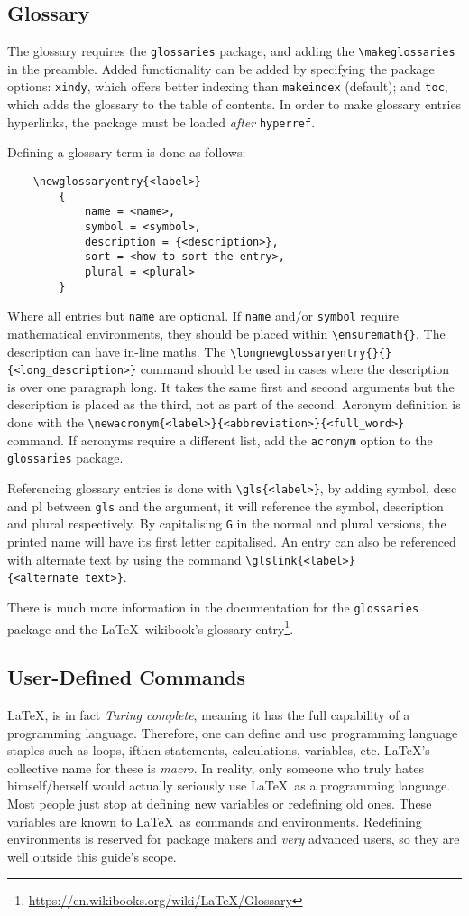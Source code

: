 \subsection{Glossary}
%
The glossary requires the \verb|glossaries| package, and adding the \verb|\makeglossaries| in the preamble. Added functionality can be added by specifying the package options: \verb|xindy|, which offers better indexing than \verb|makeindex| (default); and \verb|toc|, which adds the glossary to the table of contents. In order to make glossary entries hyperlinks, the package must be loaded \emph{after} \verb|hyperref|.

Defining a glossary term is done as follows:
\begin{verbatim}
	\newglossaryentry{<label>}
	    {
	        name = <name>,
	        symbol = <symbol>,
	        description = {<description>},
	        sort = <how to sort the entry>,
	        plural = <plural>
	    }
\end{verbatim}
Where all entries but \verb|name| are optional. If \verb|name| and/or \verb|symbol| require mathematical environments, they should be placed within \verb|\ensuremath{}|. The description can have in-line maths. The \verb|\longnewglossaryentry{}{}{<long_description>}| command should be used in cases where the description is over one paragraph long. It takes the same first and second arguments but the description is placed as the third, not as part of the second. Acronym definition is done with the \verb|\newacronym{<label>}{<abbreviation>}{<full_word>}| command. If acronyms require a different list, add the \verb|acronym| option to the \verb|glossaries| package.

Referencing glossary entries is done with \verb|\gls{<label>}|, by adding symbol, desc and pl between \verb|gls| and the argument, it will reference the symbol, description and plural respectively. By capitalising \verb|G| in the normal and plural versions, the printed name will have its first letter capitalised. An entry can also be referenced with alternate text by using the command \verb|\glslink{<label>}{<alternate_text>}|.

There is much more information in the documentation for the \verb|glossaries| package and the \LaTeX~wikibook's glossary entry\footnote{\url{https://en.wikibooks.org/wiki/LaTeX/Glossary}}.
%
\subsection{User-Defined Commands}
%
\LaTeX, is in fact \emph{Turing complete}, meaning it has the full capability of a programming language. Therefore, one can define and use programming language staples such as loops, ifthen statements, calculations, variables, etc. \LaTeX's collective name for these is \emph{macro}. In reality, only someone who truly hates himself/herself would actually seriously use \LaTeX~as a programming language. Most people just stop at defining new variables or redefining old ones. These variables are known to \LaTeX~as commands and environments. Redefining environments is reserved for package makers and \emph{very} advanced users, so they are well outside this guide's scope.


